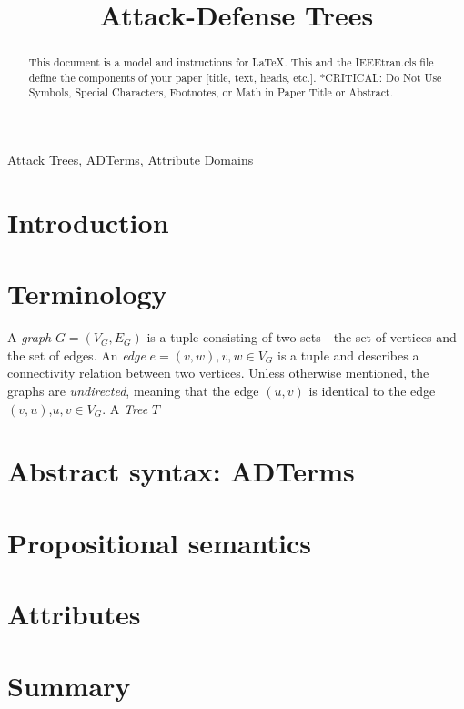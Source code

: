\documentclass[conference]{IEEEtran}
\begin{document}
\title{Attack-Defense Trees}

\author{
}

\maketitle

\begin{abstract}
This document is a model and instructions for \LaTeX.
This and the IEEEtran.cls file define the components of your paper [title, text, heads, etc.]. *CRITICAL: Do Not Use Symbols, Special Characters, Footnotes, 
or Math in Paper Title or Abstract.
\end{abstract}

\begin{IEEEkeywords}
Attack Trees, ADTerms, Attribute Domains
\end{IEEEkeywords}

\section{Introduction}
\section{Terminology}
A \textit{graph} $G=(V_G,E_G)$ is a tuple consisting of two sets - the set of vertices and the set of edges. An \textit{edge} $e = (v,w), v,w \in V_G$ is a tuple and describes a connectivity relation between two vertices. Unless otherwise mentioned, the graphs are \textit{undirected}, meaning that the edge $(u,v)$ is identical to the edge $(v,u)$,$u,v\in V_G$. A \textit{Tree} $T$ 
\section{Abstract syntax: ADTerms}
\section{Propositional semantics}
\section{Attributes}
\section{Summary}
\end{document}
